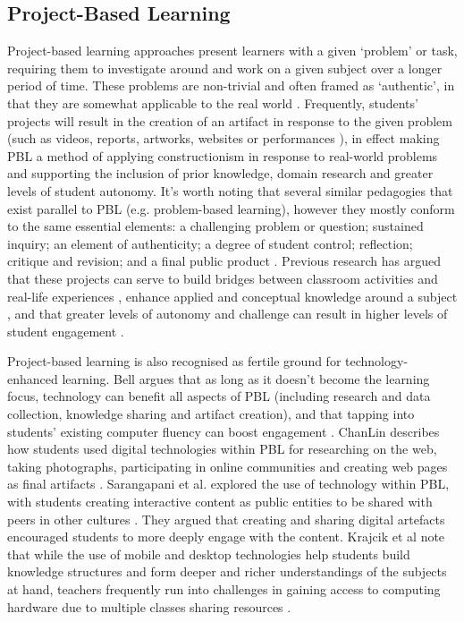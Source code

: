 \documentclass[,hyphens]{sigchi}
\begin{document}
\subsection{Project-Based Learning}
Project-based learning approaches present learners with a given `problem' or task, requiring them to investigate around and work on a given subject over a longer period of time. These problems are non-trivial and often framed as `authentic', in that they are somewhat applicable to the real world \cite{Blumenfeld1991}. Frequently, students' projects will result in the creation of an artifact in response to the given problem (such as videos, reports, artworks, websites or performances \cite{Holubova2008}), in effect making PBL a method of applying constructionism in response to real-world problems and supporting the inclusion of prior knowledge, domain research and greater levels of student autonomy. It's worth noting that several similar pedagogies that exist parallel to PBL (e.g. problem-based learning), however they mostly conform to the same essential elements: a challenging problem or question; sustained inquiry; an element of authenticity; a degree of student control; reflection; critique and revision; and a final public product \cite{Larmer2015}. Previous research has argued that these projects can serve to build bridges between classroom activities and real-life experiences \cite{Blumenfeld1991}, enhance applied and conceptual knowledge around a subject \cite{Boaler1999}, and that greater levels of autonomy and challenge can result in higher levels of student engagement \cite{Wurdinger2007}.

Project-based learning is also recognised as fertile ground for technology-enhanced learning. Bell argues that as long as it doesn't become the learning focus, technology can benefit all aspects of PBL (including research and data collection, knowledge sharing and artifact creation), and that tapping into students' existing computer fluency can boost engagement \cite{Bell2010}. ChanLin describes how students used digital technologies within PBL for researching on the web, taking photographs, participating in online communities and creating web pages as final artifacts \cite{ChanLin2008}. Sarangapani et al. explored the use of technology within PBL, with students creating interactive content as public entities to be shared with peers in other cultures \cite{Sarangapani2018}. They argued that creating and sharing digital artefacts encouraged students to more deeply engage with the content. Krajcik et al note that while the use of mobile and desktop technologies help students build knowledge structures and form deeper and richer understandings of the subjects at hand, teachers frequently run into challenges in gaining access to computing hardware due to multiple classes sharing resources \cite{Krajcik2006}.
\end{document}
